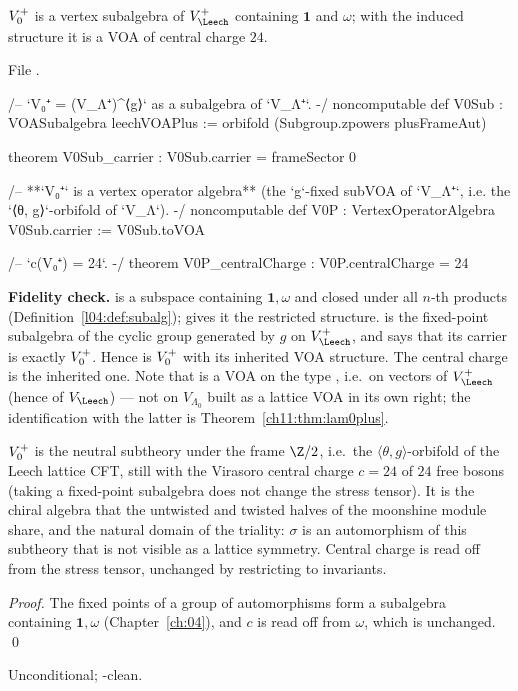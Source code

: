 \begin{theorem}\label{ch11:thm:V0P}
$V_0^{+}$ is a vertex subalgebra of $V_\Leech^+$ containing $\mathbf 1$ and $\omega$; with the
induced structure it is a VOA of central charge $24$.
\end{theorem}
\noindent File .
\begin{leancode}
/-- `V₀⁺ = (V_Λ⁺)^{⟨g⟩}` as a subalgebra of `V_Λ⁺`. -/
noncomputable def V0Sub : VOASubalgebra leechVOAPlus := orbifold (Subgroup.zpowers plusFrameAut)

theorem V0Sub_carrier : V0Sub.carrier = frameSector 0

/-- **`V₀⁺` is a vertex operator algebra** (the `g`-fixed subVOA of `V_Λ⁺`, i.e. the
`⟨θ, g⟩`-orbifold of `V_Λ`). -/
noncomputable def V0P : VertexOperatorAlgebra V0Sub.carrier := V0Sub.toVOA

/-- `c(V₀⁺) = 24`. -/
theorem V0P_centralCharge : V0P.centralCharge = 24
\end{leancode}
\begin{dictionary}
\textbf{Fidelity check.}   is a subspace containing $\mathbf 1,\omega$ and
closed under all $n$-th products (Definition~\ref{l04:def:subalg});  gives it the restricted
structure.   is the fixed-point subalgebra of the cyclic group generated by $g$ on
$V_\Leech^+$, and  says that its carrier is exactly $V_0^{+}$.  Hence
 is $V_0^{+}$ with its inherited VOA structure.  The central charge is the inherited one.
Note that  is a VOA on the type , i.e.\ on vectors of $V_\Leech^+$
(hence of $V_\Leech$) --- not on $V_{\Lambda_0}$ built as a lattice VOA in its own right; the
identification with the latter is Theorem~\ref{ch11:thm:lam0plus}.
\end{dictionary}

\begin{physics}
$V_0^{+}$ is the neutral subtheory under the frame $\Z/2$, i.e.\ the $\langle\theta,g\rangle$-orbifold of the Leech lattice CFT, still with the Virasoro central charge $c=24$ of $24$ free bosons (taking a fixed-point subalgebra does not change the stress tensor). It is the chiral algebra that the untwisted and twisted halves of the moonshine module share, and the natural domain of the triality: $\sigma$ is an automorphism of this subtheory that is not visible as a lattice symmetry. Central charge is read off from the stress tensor, unchanged by restricting to invariants.
\end{physics}
\emph{Proof.}  The fixed points of a group of automorphisms form a subalgebra containing
$\mathbf 1,\omega$ (Chapter~\ref{ch:04}), and $c$ is read off from $\omega$, which is unchanged. \qed
\begin{status}Unconditional; -clean.\end{status}

